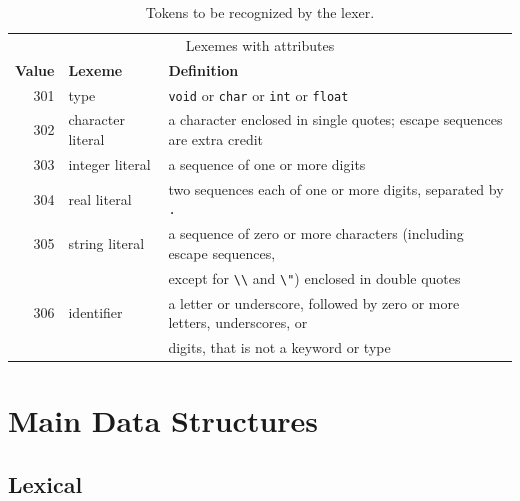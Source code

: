\documentclass{article}
\begin{document}
\begin{table}[t]
		\begin{tabular}{rll}
			\\
			\multicolumn{3}{c}{Lexemes with attributes}
			\\[1mm]
			{\bf Value} & {\bf Lexeme} & {\bf Definition}
			\\ \hline
			301 & type & \verb|void| or \verb|char| or \verb|int| or \verb|float|
			\\
			302 & character literal & a character enclosed in single quotes;
			escape sequences are extra credit
			\\
			303 & integer literal & a sequence of one or more digits
			\\
			304 & real literal & two sequences each of one or more digits, separated by \verb|.|
			\\
			305 & string literal & a sequence of zero or more characters (including escape sequences,
			\\ & & except for \verb|\\| and \verb|\"|) enclosed in double quotes
			\\
			306 & identifier & a letter or underscore, followed by zero or more letters,
			underscores, or
			\\ & & digits, that is not a keyword or type
		\end{tabular}

		\caption{Tokens to be recognized by the lexer.}
		\label{tab:tokens}
	\end{table}

	\section{Main Data Structures}\label{sec:main-data-structures}
	\subsection{Lexical}\label{subsec:lexical2}
\end{document}
